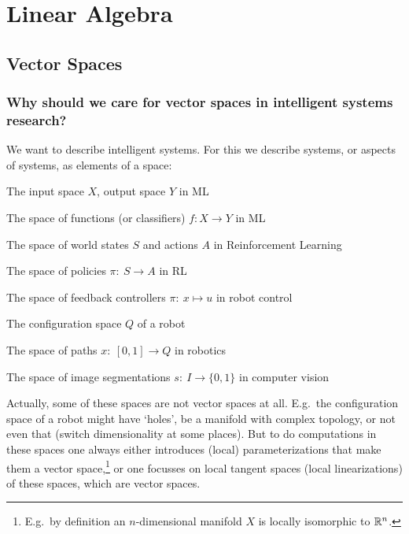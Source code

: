 

%




\section{Linear Algebra}

\subsection{Vector Spaces}

\subsubsection{Why should we care for vector spaces in intelligent systems
research?}

We want to describe intelligent systems. For this we describe systems,
or aspects of systems, as elements of a space:
\begin{items}
\item The input space $X$, output space $Y$ in ML
\item The space of functions (or classifiers) $f: X \to Y $ in
ML
\item The space of world states $S$ and actions $A$ in Reinforcement Learning
\item The space of policies $\pi:~ S \to A$ in RL
\item The space of feedback controllers $\pi:~ x \mapsto u$ in robot control
\item The configuration space $Q$ of a robot
\item The space of paths $x:~ [0,1] \to Q$ in robotics
\item The space of image segmentations $s:~ I \to \{0,1\}$ in computer vision
\end{items}
Actually, some of these spaces are not vector spaces at all. E.g.\ the
configuration space of a robot might have `holes', be a manifold with
complex topology, or not even that (switch dimensionality at some
places). But to do computations in these spaces one always either
introduces (local) parameterizations that make them a vector
space,\footnote{E.g.\ by definition an $n$-dimensional manifold $X$
is locally isomorphic to ${\mathbb{R}}^n$.} or one focusses on local tangent
spaces (local linearizations) of these spaces, which are vector
spaces.

